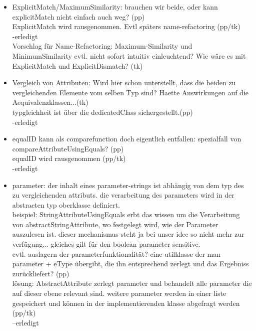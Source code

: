 \begin{itemize}
\item ExplicitMatch/MaximumSimilarity: brauchen wir beide, oder kann explicitMatch
nicht einfach auch weg? (pp)\\
ExplicitMatch wird rausgenommen. Evtl späters name-refactoring (pp/tk)\\
-erledigt\\
Vorschlag für Name-Refactoring: Maximum-Similarity und MinimumSimilarity evtl. nicht sofort intuitiv einleuchtend? 
Wie wäre es mit ExplicitMatch und ExplicitDismatch? (tk)

\item Vergleich von Attributen: Wird hier schon unterstellt, dass die beiden zu 
vergleichenden Elemente vom selben Typ sind? Haette Auswirkungen auf die 
Aequivalenzklassen...(tk)\\ typgleichheit ist über die dedicatedClass 
sichergestellt.(pp)\\
-erledigt

\item equalID kann als comparefunction doch eigentlich entfallen: spezialfall von
compareAttributeUsingEquals? (pp)\\
equalID wird rausgenommen (pp/tk)\\
-erledigt

\item parameter: der inhalt eines parameter-strings ist abhängig von dem typ des zu
vergleichenden attributs. die verarbeitung des parameters wird in der
abstracten typ oberklasse definiert. \\
beispiel: StringAttributeUsingEquals erbt
das wissen um die Verarbeitung von abstractStringAttribute, wo festgelegt wird,
wie der Parameter auszulesen ist. dieser mechanismus steht ja bei unser idee so
nicht mehr zur verfügung... gleiches gilt für den boolean parameter
sensitive.\\
evtl. auslagern der parameterfunktionalität? eine utilklasse der man parameter
+ eType übergibt, die ihn entsprechend zerlegt und das Ergebniss zurückliefert?
(pp)\\

lösung: AbstractAttribute zerlegt parameter und behandelt alle parameter die 
auf dieser ebene relevant sind. weitere parameter werden in einer liste gespeichert
und können in der implementierenden klasse abgefragt werden (pp/tk)\\
--erledigt\\ 


\end{itemize}
